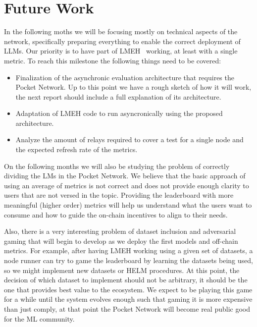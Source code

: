 \section{Future Work}\label{sec:z}

In the following moths we will be focusing mostly on technical aspects of the network, specifically preparing everything to enable the correct deployment of \glspl{LLM}. Our priority is to have part of \gls{LMEH}~\cite{eval-harness} working, at least with a single metric.
To reach this milestone the following things need to be covered:
\begin{itemize}
    \item Finalization of the asynchronic evaluation architecture that requires the Pocket Network. Up to this point we have a rough sketch of how it will work, the next report should include a full explanation of its architecture. 
    \item Adaptation of \gls{LMEH} code to run asyncronically using the proposed architecture.
    \item Analyze the amount of relays required to cover a test for a single node and the expected refresh rate of the metrics.
\end{itemize}

On the following months we will also be studying the problem of correctly dividing the \glspl{LM} in the Pocket Network. We believe that the basic approach of using an average of metrics is not correct and does not provide enough clarity to users that are not versed in the topic. Providing the leaderboard with more meaningful (higher order) metrics will help us understand what the users want to consume and how to guide the on-chain incentives to align to their needs.

Also, there is a very interesting problem of dataset inclusion and adversarial gaming that will begin to develop as we deploy the first models and off-chain metrics. For example, after having \gls{LMEH} working using a given set of datasets, a node runner can try to game the leaderboard by learning the datasets being used, so we might implement new datasets or \gls{HELM} procedures. At this point, the decision of which dataset to implement should not be arbitrary, it should be the one that provides best value to the ecosystem. We expect to be playing this game for a while until the system evolves enough such that gaming it is more expensive than just comply, at that point the Pocket Network will become real public good for the \gls{ML} community.
